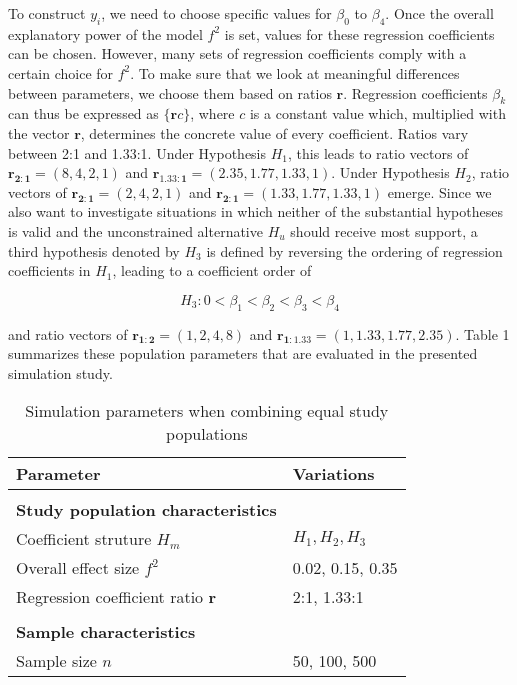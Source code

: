 \documentclass[11pt, a4paper]{article} %
\begin{document}
To construct $y_i$, we need to choose specific values for $\beta_0$ to $\beta_4$. Once the overall explanatory power of the model $f^2$ is set, values for these regression coefficients can be chosen. However, many sets of regression coefficients comply with a certain choice for $f^2$. To make sure that we look at meaningful differences between parameters, we choose them based on ratios $\bm{r}$. Regression coefficients $\beta_k$ can thus be expressed as $\{\bm{r}c\}$, where $c$ is a constant value which, multiplied with the vector $\bm{r}$, determines the concrete value of every coefficient. Ratios vary between 2:1 and 1.33:1. Under Hypothesis $H_1$, this leads to ratio vectors of $\bm{r_{2:1}}=(8,4,2,1)$ and $\bm{r_{1.33:1}}=(2.35,1.77,1.33,1)$. Under Hypothesis $H_2$, ratio vectors of $\bm{r_{2:1}}=(2,4,2,1)$ and $\bm{r_{2:1}}=(1.33,1.77,1.33,1)$ emerge. Since we also want to investigate situations in which neither of the substantial hypotheses is valid and the unconstrained alternative $H_u$ should receive most support, a third hypothesis denoted by $H_3$ is defined by reversing the ordering of regression coefficients in $H_1$, leading to a coefficient order of

\begin{equation}
H_3: 0 <\beta_1 < \beta_2 < \beta_3 < \beta_4
\end{equation}

\noindent and ratio vectors of $\bm{r_{1:2}}=(1,2,4,8)$ and $\bm{r_{1:1.33}}=(1,1.33,1.77,2.35)$. Table 1 summarizes these population parameters that are evaluated in the presented simulation study.   

\begin{table}[ht]
	\centering
	\caption{Simulation parameters when combining equal study populations}
	\begin{tabular}{ll}
		\hline
		Parameter                                   & Variations   \\ \hline
		&                  \\
		\textbf{Study population characteristics} &                  \\ 
		Coefficient struture $H_m$                                       & $H_1, H_2, H_3$  \\
		Overall effect size $f^2$                                       & 0.02, 0.15, 0.35 \\
		Regression coefficient ratio $\bm{r}$                                    & 2:1, 1.33:1      \\
		&                  \\
		\textbf{Sample characteristics}           &                  \\ 
		Sample size $n$                                         & 50, 100, 500   \\ 
		\hline
	\end{tabular}
\end{table}
\end{document}
